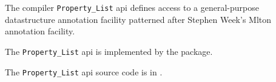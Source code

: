 
The compiler {\tt Property\_List} api defines access to a general-purpose datastructure annotation 
facility patterned after Stephen Week's Mlton annotation facility.

The {\tt Property\_List} api is implemented by the  package.

The {\tt Property\_List} api source code is in .
